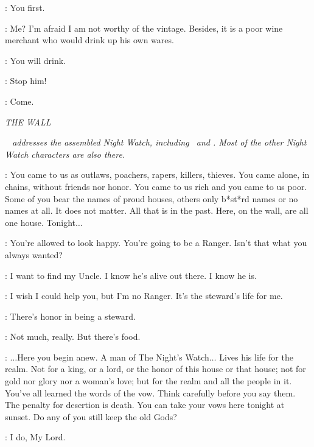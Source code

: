 \JORAH: You first. 

\WINESELLER: Me?  I'm afraid I am not worthy of the vintage.  Besides, it is a poor wine merchant who would drink up his own wares. 

\DAENERYS: You will drink. 


\JORAH: Stop him! 


\JORAH: Come. 


\scene

\textit{THE WALL} 

\textit{\JEOR ~ addresses the assembled Night Watch, including \JON ~and \SAM. Most of the other Night Watch characters are also there.} 

\JEOR: You came to us as outlaws, poachers, rapers, killers, thieves. You came alone, in chains, without friends nor honor. You came to us rich and you came to us poor. Some of you bear the names of proud houses, others only b*st*rd names or no names at all. It does not matter. All that is in the past. Here, on the wall, are all one house. Tonight$\ldots$  

 \SAM: You're allowed to look happy. You're going to be a Ranger. Isn't that what you always wanted? 

\JON: I want to find my Uncle. I know he's alive out there.  I know he is. 

\SAM: I wish I could help you, but I'm no Ranger.  It's the steward's life for me. 

\JON: There's honor in being a steward. 

\SAM: Not much, really.  But there's food. 

\JEOR: $\ldots$Here you begin anew. A man of The Night's Watch$\ldots$ Lives his life for the realm. Not for a king, or a lord, or the honor of this house or that house; not for gold nor glory nor a woman's love; but for the realm and all the people in it. You've all learned the words of the vow. Think carefully before you say them. The penalty for desertion is death. You can take your vows here tonight at sunset. Do any of you still keep the old Gods? 

\JON: I do, My Lord. 

